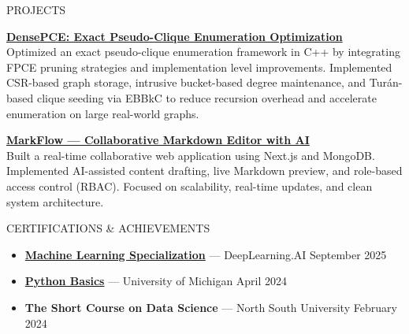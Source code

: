 \documentclass{resume}
\begin{document}
\begin{rSection}{PROJECTS}
\vspace{-0.4em}

\item \textbf{\href{https://github.com/samiulislam07/DensePCE}{DensePCE: Exact Pseudo-Clique Enumeration Optimization}} \\
Optimized an exact pseudo-clique enumeration framework in C++ by integrating FPCE pruning strategies and implementation level improvements. Implemented CSR-based graph storage, intrusive bucket-based degree maintenance, and Tur\'an-based clique seeding via EBBkC to reduce recursion overhead and accelerate enumeration on large real-world graphs.

\item \textbf{\href{https://markflow-6o3q.onrender.com/}{MarkFlow — Collaborative Markdown Editor with AI}} \\
Built a real-time collaborative web application using Next.js and MongoDB. Implemented AI-assisted content drafting, live Markdown preview, and role-based access control (RBAC). Focused on scalability, real-time updates, and clean system architecture.


\end{rSection}

\begin{rSection}{CERTIFICATIONS \& ACHIEVEMENTS}

\begin{itemize}
    \item \textbf{\href{https://www.coursera.org/account/accomplishments/specialization/ZV62C25ALJR9}{Machine Learning Specialization}} — DeepLearning.AI \hfill September 2025
    \item \textbf{\href{https://www.coursera.org/account/accomplishments/verify/B2LBV7SGR2JT}{Python Basics}} — University of Michigan \hfill April 2024
    \item \textbf{The Short Course on Data Science} — North South University \hfill February 2024
\end{itemize}

\end{rSection}
\end{document}
